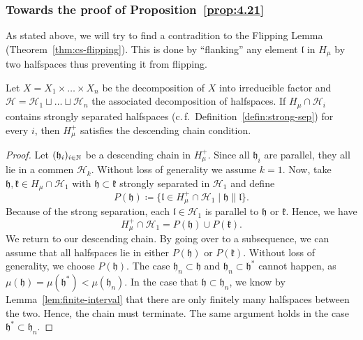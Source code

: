 \subsubsection*{Towards the proof of Proposition~\ref{prop:4.21}}

As stated above, we will try to find a contradition to the Flipping Lemma (Theorem~\ref{thm:cs-flipping}). This is done by \enquote{flanking} any element \(\mathfrak{l}\) in \(H_\mu\) by two halfspaces thus preventing it from flipping.

\begin{lemma}[{\cite[Lemma~4.18]{MR3509968}}]
  \label{lem:4.18}
  Let \(X = X_1 \times \dots \times X_n\) be the decomposition of \(X\) into irreducible factor and \(\mathcal{H} = \mathcal{H}_1 \sqcup \dots \sqcup \mathcal{H}_n\) the associated decomposition of halfspaces. If \(H_\mu \cap \mathcal{H}_i\) contains strongly separated halfspaces (c.\,f.~Definition~\ref{defin:strong-sep}) for every \(i\), then \(H_\mu^+\) satisfies the descending chain condition.
\end{lemma}

\begin{proof}
  Let \((\mathfrak{h}_i)_{i \in \mathbb{N}}\) be a descending chain in \(H_\mu^+\). Since all \(\mathfrak{h}_i\) are parallel, they all lie in a commen \(\mathcal{H}_k\). Without loss of generality we assume \(k=1\). Now, take \(\mathfrak{h, k} \in H_\mu \cap \mathcal{H}_1\) with \(\mathfrak{h} \subset \mathfrak{k}\) strongly separated in \(\mathcal{H}_1\) and define
  \[
    P(\mathfrak{h}) \coloneqq \{\mathfrak{l} \in H_\mu^+ \cap \mathcal{H}_1 \mid \mathfrak{h} \parallel \mathfrak{l}\}.
  \]
  Because of the strong separation, each \(\mathfrak{l} \in \mathcal{H}_1\) is parallel to \(\mathfrak{h}\) or \(\mathfrak{k}\). Hence, we have
  \[
    H_\mu^+ \cap \mathcal{H}_1 = P(\mathfrak{h}) \cup P(\mathfrak{k}).
  \]
  We return to our descending chain. By going over to a subsequence, we can assume that all halfspaces lie in either \(P(\mathfrak{h})\) or \(P(\mathfrak{k})\). Without loss of generality, we choose \(P(\mathfrak{h})\). The case \(\mathfrak{h}_n \subset \mathfrak{h}\) and \(\mathfrak{h}_n \subset \mathfrak{h}^\ast\) cannot happen, as \(\mu(\mathfrak{h}) = \mu(\mathfrak{h}^\ast) < \mu(\mathfrak{h}_n)\). In the case that \(\mathfrak{h} \subset \mathfrak{h}_n\), we know by Lemma~\ref{lem:finite-interval} that there are only finitely many halfspaces between the two. Hence, the chain must terminate. The same argument holds in the case \(\mathfrak{h}^\ast \subset \mathfrak{h}_n\).
\end{proof}


